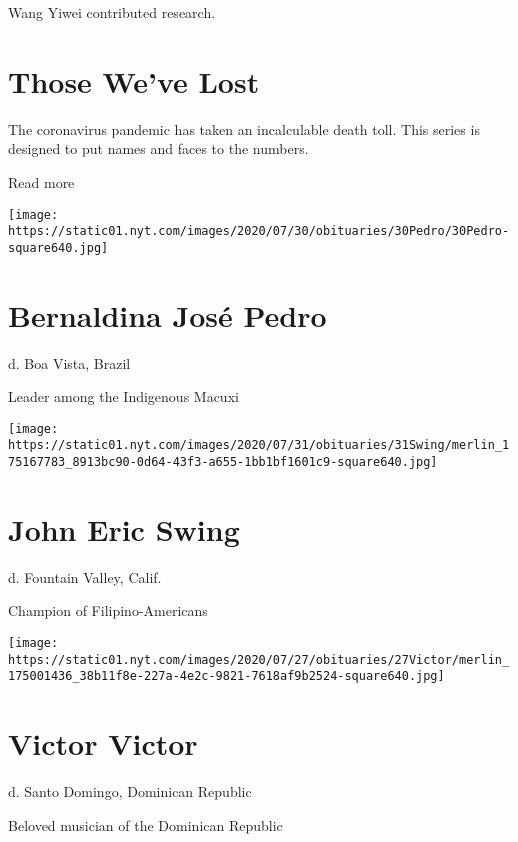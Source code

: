Wang Yiwei contributed research.

\href{https://www.nytimes.com/interactive/2020/obituaries/people-died-coronavirus-obituaries.html?action=click\&pgtype=Article\&state=default\&region=BELOW_MAIN_CONTENT\&context=covid_obits_promo}{}

\hypertarget{those-weve-lost}{%
\section{Those We've Lost}\label{those-weve-lost}}

The coronavirus pandemic has taken an incalculable death toll. This
series is designed to put names and faces to the numbers.

Read more

\texttt{[image: https://static01.nyt.com/images/2020/07/30/obituaries/30Pedro/30Pedro-square640.jpg]}

\hypertarget{bernaldina-josuxe9-pedro}{%
\section{Bernaldina José Pedro}\label{bernaldina-josuxe9-pedro}}

d. Boa Vista, Brazil

Leader among the Indigenous Macuxi

\texttt{[image: https://static01.nyt.com/images/2020/07/31/obituaries/31Swing/merlin\_175167783\_8913bc90-0d64-43f3-a655-1bb1bf1601c9-square640.jpg]}

\hypertarget{john-eric-swing}{%
\section{John Eric Swing}\label{john-eric-swing}}

d. Fountain Valley, Calif.

Champion of Filipino-Americans

\texttt{[image: https://static01.nyt.com/images/2020/07/27/obituaries/27Victor/merlin\_175001436\_38b11f8e-227a-4e2c-9821-7618af9b2524-square640.jpg]}

\hypertarget{victor-victor}{%
\section{Victor Victor}\label{victor-victor}}

d. Santo Domingo, Dominican Republic

Beloved musician of the Dominican Republic

